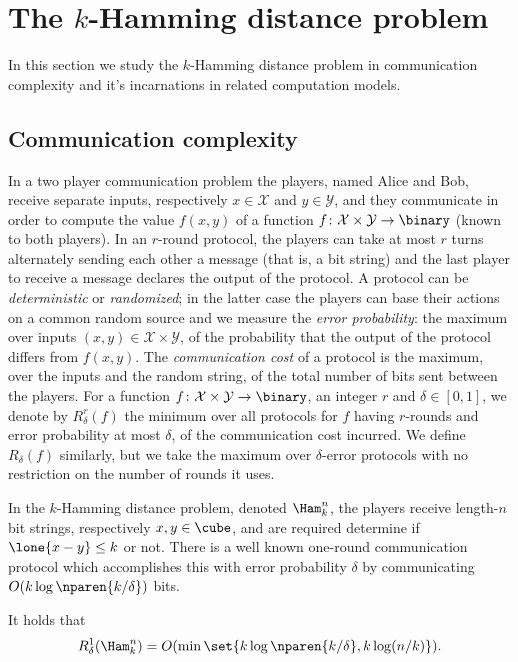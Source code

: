 \chapter{The $k$-Hamming distance problem}
\label{sec:ham}
In this section we study the $k$-Hamming distance
problem in communication complexity and
it's incarnations in related computation models.

\section{Communication complexity}
\label{sec:ham:intro}
In a two player communication problem the players, 
named Alice and Bob, receive separate inputs, 
respectively $x\in \mathcal{X}$ and $y\in \mathcal{Y}$, 
and they communicate in order to compute the value 
$f(x,y)$ of a function
$f\colon \mathcal{X}\times \mathcal{Y}\to\binary$ 
(known to both players). 
In an $r$-round protocol, the players can take at most 
$r$ turns alternately sending each other a message 
(that is, a bit string) and the last player to receive 
a message declares the output of the protocol.
A protocol can be {\em deterministic} or {\em randomized}; 
in the latter case the players can base their actions on 
a common random source and we measure the 
{\em error probability}: the maximum over inputs 
$(x,y)\in \mathcal{X}\times\mathcal{Y}$, of the probability 
that the output of the protocol differs from $f(x,y)$. 
The {\em communication cost} of a protocol is the maximum, 
over the inputs and the random string, of the total number 
of bits sent between the players.
For a function 
$f\colon \mathcal{X}\times\mathcal{Y}\to\binary$, 
an integer $r$ and $\delta\in[0,1]$, we denote by 
$R^r_{\delta}(f)$ the minimum over all protocols
for $f$ having $r$-rounds and error probability at most 
$\delta$, of the communication cost incurred. We define 
$R_{\delta}(f)$ similarly, but we take the maximum over 
$\delta$-error protocols with no restriction on the number 
of rounds it uses.

In the $k$-Hamming distance problem, denoted $\Ham^n_k$,
the players receive length-$n$ bit strings, respectively 
$x,y\in\cube$, and are required determine if 
$\lone{x-y}\le k$ or not.
There is a well known one-round communication protocol
which accomplishes this with error probability $\delta$ 
by communicating $O(k\log\nparen{k/\delta})$ bits.

\begin{theorem}
\label{thm:ub}
It holds that $$R^1_\delta(\Ham^n_k) = 
O(\min\set{k\log\nparen{k/\delta}, k\log (n/k)}).$$
\end{theorem}

